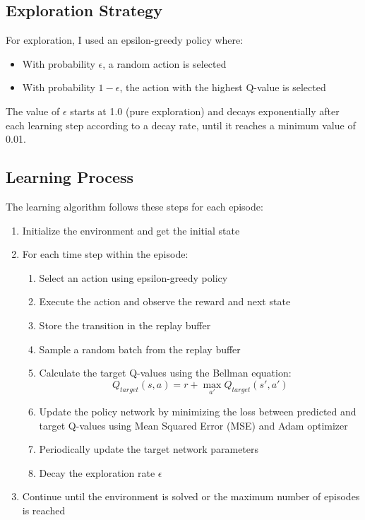 \documentclass{article}
\begin{document}
\subsection{Exploration Strategy}
For exploration, I used an epsilon-greedy policy where:
\begin{itemize}
    \item With probability $\epsilon$, a random action is selected
    \item With probability $1-\epsilon$, the action with the highest Q-value is selected
\end{itemize}
The value of $\epsilon$ starts at 1.0 (pure exploration) and decays exponentially after each learning step according to a decay rate, until it reaches a minimum value of 0.01.

\subsection{Learning Process}
The learning algorithm follows these steps for each episode:
\begin{enumerate}
    \item Initialize the environment and get the initial state
    \item For each time step within the episode:
    \begin{enumerate}
        \item Select an action using epsilon-greedy policy
        \item Execute the action and observe the reward and next state
        \item Store the transition in the replay buffer
        \item Sample a random batch from the replay buffer
        \item Calculate the target Q-values using the Bellman equation:
        \begin{equation}
            Q_{target}(s,a) = r + \max_{a'} Q_{target}(s',a')
        \end{equation}
        \item Update the policy network by minimizing the loss between predicted and target Q-values using Mean Squared Error (MSE) and Adam optimizer
        \item Periodically update the target network parameters
        \item Decay the exploration rate $\epsilon$
    \end{enumerate}
    \item Continue until the environment is solved or the maximum number of episodes is reached
\end{enumerate}
\end{document}
